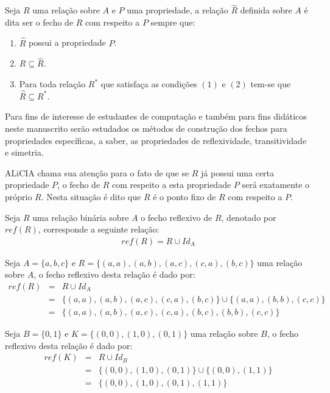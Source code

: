 \begin{definicao}
	Seja $R$ uma relação sobre $A$ e $P$ uma propriedade, a relação $\widehat{R}$ definida sobre $A$ é dita ser o fecho de $R$ com respeito a $P$ sempre que:
	\begin{enumerate}
		\item $\widehat{R}$ possui a propriedade $P$.
		\item $R \subseteq \widehat{R}$.
		\item Para toda relação $R^*$ que satisfaça as condições $(1)$ e $(2)$ tem-se que $\widehat{R} \subseteq R^*$. 
	\end{enumerate}
\end{definicao}

Para fins de interesse de estudantes de computação e também para fins didáticos neste manuscrito serão estudados os métodos de construção dos fechos para propriedades específicas, a saber, as propriedades de reflexividade, transitividade e simetria. 

\begin{cuidado}
  ALiCIA chama sua atenção para o fato de que se $R$ já possui uma certa propriedade $P$, o fecho de $R$ com respeito a esta propriedade $P$ será exatamente o próprio $R$. Nesta situação é dito que $R$ é o ponto fixo de $R$ com respeito a $P$.
\end{cuidado}


\begin{definicao}\label{def:FechoReflexivo}
	Seja $R$ uma relação binária sobre $A$ o fecho reflexivo de $R$, denotado por $ref(R)$, corresponde a seguinte relação:
	\begin{eqnarray*}
		ref(R) = R \cup Id_A
	\end{eqnarray*}
\end{definicao}

\begin{exemplo}
	Seja $A = \{a, b, c\}$ e $R = \{(a, a), (a, b), (a, c), (c, a), (b, c)\}$ uma relação sobre $A$,  o fecho reflexivo desta relação é dado por:
	\begin{eqnarray*}
		ref(R)  & = & R \cup Id_A\\
		& = & \{(a, a), (a, b), (a, c), (c, a), (b, c)\} \cup \{(a,a), (b, b), (c,c)\}\\
		& = & \{(a, a), (a, b), (a, c), (c, a), (b, c), (b, b), (c,c)\}
	\end{eqnarray*}
\end{exemplo}

\begin{exemplo}
	Seja $B = \{0, 1\}$ e $K= \{(0, 0), (1, 0), (0, 1)\}$ uma relação sobre $B$,  o fecho reflexivo desta relação é dado por:
	\begin{eqnarray*}
		ref(K)  & = & R \cup Id_B\\
		& = & \{(0, 0), (1, 0), (0, 1)\} \cup \{(0,0), (1, 1)\}\\
		& = & \{(0, 0), (1, 0), (0, 1), (1, 1)\} 
	\end{eqnarray*}
\end{exemplo}

